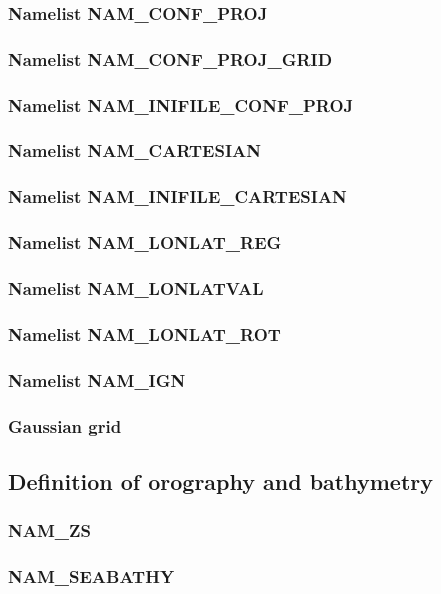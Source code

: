\subsubsection{Namelist NAM\_CONF\_PROJ}
\subsubsection{Namelist NAM\_CONF\_PROJ\_GRID}
\subsubsection{Namelist NAM\_INIFILE\_CONF\_PROJ}
\subsubsection{Namelist NAM\_CARTESIAN}
\subsubsection{Namelist NAM\_INIFILE\_CARTESIAN}
\subsubsection{Namelist NAM\_LONLAT\_REG}
\subsubsection{Namelist NAM\_LONLATVAL}
\subsubsection{Namelist NAM\_LONLAT\_ROT}
\subsubsection{Namelist NAM\_IGN}
\subsubsection{Gaussian grid}

\newpage
\subsection{Definition of orography and bathymetry}
\subsubsection{NAM\_ZS}
\subsubsection{NAM\_SEABATHY}

